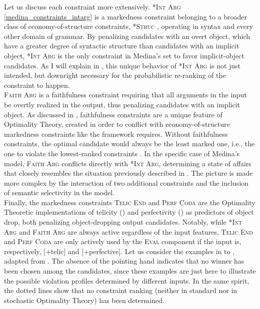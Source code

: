 Let us discuss each constraint more extensively. \textsc{*Int Arg} \ref{medina_constraints_intarg} is a markedness constraint belonging to a broader class of economy-of-structure constraints, \textsc{*Struc} \parencite{buchwald2002recoverability, hartkemeyer2000ot}, operating in syntax and every other domain of grammar. By penalizing candidates with an overt object, which have a greater degree of syntactic structure than candidates with an implicit object, \textsc{*Int Arg} is the only constraint in Medina's set to favor implicit-object candidates. As I will explain in , this unique behavior of \textsc{*Int Arg} is not just intended, but downright necessary for the probabilistic re-ranking of the constraint to happen.\\
\textsc{Faith Arg} is a faithfulness constraint requiring that all arguments in the input be overtly realized in the output, thus penalizing candidates with an implicit object. As discussed in , faithfulness constraints are a unique feature of Optimality Theory, created in order to conflict with economy-of-structure markedness constraints like the framework requires. Without faithfulness constraints, the optimal candidate would always be the least marked one, i.e., the one to violate the lowest-ranked constraints \parencite[3]{legendre2001introduction}. In the specific case of Medina's model, \textsc{Faith Arg} conflicts directly with \textsc{*Int Arg}, determining a state of affairs that closely resembles the situation previously described in . The picture is made more complex by the interaction of two additional constraints and the inclusion of semantic selectivity in the model.\\
Finally, the markedness constraints \textsc{Telic End} and \textsc{Perf Coda} are the Optimality Theoretic implementations of telicity () and perfectivity () as predictors of object drop, both penalizing object-dropping output candidates. Notably, while \textsc{*Int Arg} and \textsc{Faith Arg} are always active regardless of the input features, \textsc{Telic End} and \textsc{Perf Coda} are only actively used by the \textsc{Eval} component if the input is, respectively, [+telic] and [+perfective]. Let us consider the examples in  to , adapted from \textcite{Medina2007}. The absence of the pointing hand indicates that no winner has been chosen among the candidates, since these examples are just here to illustrate the possible violation profiles determined by different inputs. In the same spirit, the dotted lines show that no constraint ranking (neither in standard nor in stochastic Optimality Theory) has been determined.\\
